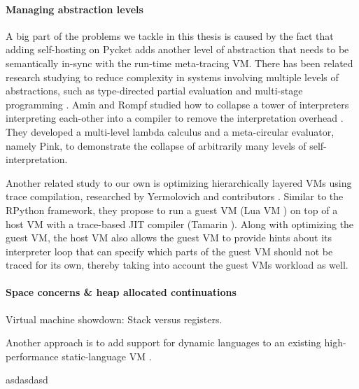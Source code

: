\paragraph{Managing abstraction levels}
A big part of the problems we tackle in this thesis is caused by the
fact that adding self-hosting on Pycket adds another level of
abstraction that needs to be semantically in-sync with the run-time
meta-tracing VM. There has been related research studying to reduce
complexity in systems involving multiple levels of abstractions, such
as type-directed partial evaluation \cite{tdpe:99} and multi-stage
programming \cite{multi-stage:97, multi-stage:17}. Amin and Rompf
studied how to collapse a tower of interpreters interpreting
each-other into a compiler to remove the interpretation overhead
\cite{collapse:17}. They developed a multi-level lambda calculus and a
meta-circular evaluator, namely Pink, to demonstrate the collapse of
arbitrarily many levels of self-interpretation.

Another related study to our own is optimizing hierarchically layered
VMs using trace compilation, researched by Yermolovich and
contributors \cite{layering:09}. Similar to the RPython framework,
they propose to run a guest VM (Lua VM \cite{luajit:08}) on top of a
host VM with a trace-based JIT compiler (Tamarin
\cite{tamarin}). Along with optimizing the guest VM, the host VM also
allows the guest VM to provide hints about its interpreter loop that
can specify which parts of the guest VM should not be traced for its
own, thereby taking into account the guest VMs workload as well.

\paragraph{Space concerns \& heap allocated continuations}
Virtual machine showdown: Stack versus registers.

Another approach is to add support for dynamic languages to an
existing high-performance static-language VM \cite{stJITdyn:12,
  dynStatComp:12}.

asdasdasd \cite{whatever:19, compWithContLLVM:16}









